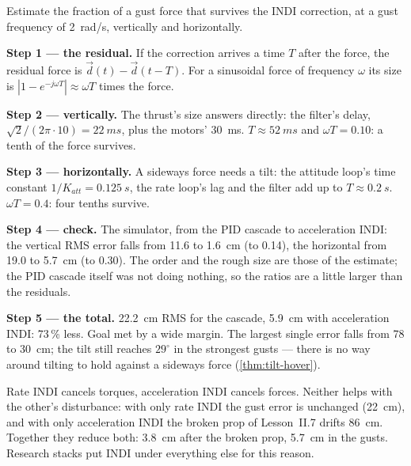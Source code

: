 \begin{example}
\label{ex:indiwind-residual}
Estimate the fraction of a gust force that survives the INDI correction, at a gust frequency of \SI{2}{rad/s}, vertically and horizontally.

\textbf{Step 1 — the residual.} If the correction arrives a time $T$ after the force, the residual force is $\vec d(t) - \vec d(t - T)$. For a sinusoidal force of frequency $\omega$ its size is $|1 - e^{-j\omega T}| \approx \omega T$ times the force.

\textbf{Step 2 — vertically.} The thrust's size answers directly: the filter's delay, $\sqrt2/(2\pi \cdot 10) = \SI{22}{ms}$, plus the motors' \SI{30}{ms}. $T \approx \SI{52}{ms}$ and $\omega T = 0.10$: a tenth of the force survives.

\textbf{Step 3 — horizontally.} A sideways force needs a tilt: the attitude loop's time constant $1/K_{att} = \SI{0.125}{s}$, the rate loop's lag and the filter add up to $T \approx \SI{0.2}{s}$. $\omega T = 0.4$: four tenths survive.

\textbf{Step 4 — check.} The simulator, from the PID cascade to acceleration INDI: the vertical RMS error falls from 11.6 to \SI{1.6}{cm} (to 0.14), the horizontal from 19.0 to \SI{5.7}{cm} (to 0.30). The order and the rough size are those of the estimate; the PID cascade itself was not doing nothing, so the ratios are a little larger than the residuals.

\textbf{Step 5 — the total.} \SI{22.2}{cm} RMS for the cascade, \SI{5.9}{cm} with acceleration INDI: 73\,\% less. Goal met by a wide margin. The largest single error falls from 78 to \SI{30}{cm}; the tilt still reaches $29^\circ$ in the strongest gusts — there is no way around tilting to hold against a sideways force (\cref{thm:tilt-hover}).
\end{example}

\begin{keyidea}
Rate INDI cancels torques, acceleration INDI cancels forces. Neither helps with the other's disturbance: with only rate INDI the gust error is unchanged (\SI{22}{cm}), and with only acceleration INDI the broken prop of Lesson~II.7 drifts \SI{86}{cm}. Together they reduce both: \SI{3.8}{cm} after the broken prop, \SI{5.7}{cm} in the gusts. Research stacks put INDI under everything else for this reason.
\end{keyidea}


